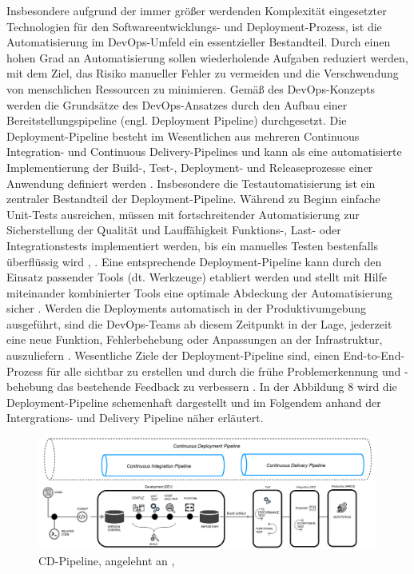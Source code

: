 Insbesondere aufgrund der immer größer werdenden Komplexität eingesetzter Technologien für den Softwareentwicklungs- und Deployment-Prozess, ist die Automatisierung im DevOps-Umfeld ein essentzieller Bestandteil. Durch einen hohen Grad an Automatisierung sollen wiederholende Aufgaben reduziert werden, mit dem Ziel, das Risiko manueller Fehler zu vermeiden und die Verschwendung von menschlichen Ressourcen zu minimieren. Gemäß des DevOps-Konzepts werden die Grundsätze des DevOps-Ansatzes durch den Aufbau einer Bereitstellungspipeline (engl. Deployment Pipeline) durchgesetzt. Die Deployment-Pipeline besteht im Wesentlichen aus mehreren Continuous Integration- und Continuous Delivery-Pipelines und kann als eine automatisierte Implementierung der Build-, Test-, Deployment- und Releaseprozesse einer Anwendung definiert werden \cite{humble_why_2011}. Insbesondere die Testautomatisierung ist ein zentraler Bestandteil der Deployment-Pipeline. Während zu Beginn einfache Unit-Tests ausreichen, müssen mit fortschreitender Automatisierung zur Sicherstellung der Qualität und Lauffähigkeit Funktions-, Last- oder Integrationstests implementiert werden, bis ein manuelles Testen bestenfalls überflüssig wird \cite[S. 27]{alt_innovationsorientiertes_2017}, \cite[S. 110 - 111]{wolff_continuous_2016}. Eine entsprechende Deployment-Pipeline kann durch den Einsatz passender Tools (dt. Werkzeuge) etabliert werden und stellt mit Hilfe miteinander kombinierter Tools eine optimale Abdeckung der Automatisierung sicher \cite[S. 268]{tokarski_strategische_2018}. Werden die Deployments automatisch in der Produktivumgebung ausgeführt, sind die DevOps-Teams ab diesem Zeitpunkt in der Lage, jederzeit eine neue Funktion, Fehlerbehebung oder Anpassungen an der Infrastruktur, auszuliefern \cite{juner_praxisbasierte_2017}. Wesentliche Ziele der Deployment-Pipeline sind, einen End-to-End-Prozess für alle sichtbar zu erstellen und durch die frühe Problemerkennung und -behebung das bestehende Feedback zu verbessern \cite[S. 3 - 4]{humble_continuous_2011}. In der Abbildung 8 wird die Deployment-Pipeline schemenhaft dargestellt und im Folgendem anhand der Intergrations- und Delivery Pipeline näher erläutert.  

\begin{figure}[h]
    \centering
    \includegraphics[scale=0.4]{Bilder/Continuous Deployment Pipeline.png}
    \caption{CD-Pipeline, angelehnt an \cite{balajee_what_2020}, \cite[S. 17]{sharma_devops_2017}}
\end{figure}

